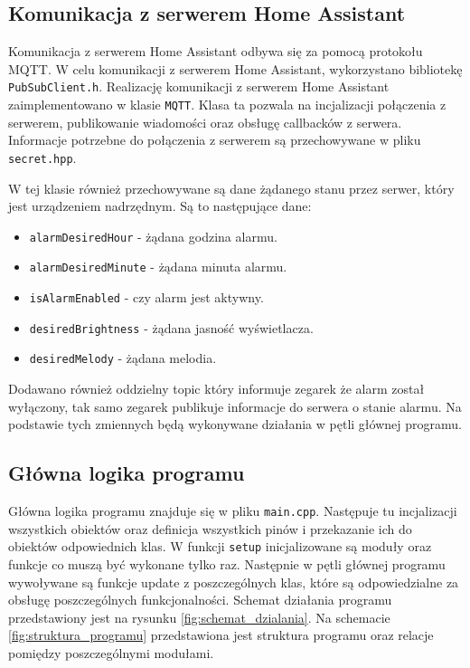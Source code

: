 \documentclass[../main.tex]{subfiles}
\begin{document}
\subsection{Komunikacja z serwerem Home Assistant}
Komunikacja z serwerem Home Assistant odbywa się za pomocą protokołu MQTT. W celu komunikacji z serwerem Home Assistant, wykorzystano bibliotekę \texttt{PubSubClient.h}.
Realizację komunikacji z serwerem Home Assistant zaimplementowano w klasie \texttt{MQTT}. Klasa ta pozwala na incjalizacji połączenia z serwerem, 
publikowanie wiadomości oraz obsługę callbacków z serwera. Informacje potrzebne do połączenia z serwerem są przechowywane w pliku \texttt{secret.hpp}.

W tej klasie również przechowywane są dane żądanego stanu przez serwer, który jest urządzeniem nadrzędnym. Są to następujące dane:
\begin{itemize}
  \item \texttt{alarmDesiredHour} - żądana godzina alarmu.
  \item \texttt{alarmDesiredMinute} - żądana minuta alarmu.
  \item \texttt{isAlarmEnabled} - czy alarm jest aktywny.
  \item \texttt{desiredBrightness} - żądana jasność wyświetlacza.
  \item \texttt{desiredMelody} - żądana melodia.
\end{itemize}

Dodawano również oddzielny topic który informuje zegarek że alarm został wyłączony, tak samo zegarek publikuje informacje do serwera o stanie alarmu.
Na podstawie tych zmiennych będą wykonywane działania w pętli głównej programu.

\subsection{Główna logika programu}
Główna logika programu znajduje się w pliku \texttt{main.cpp}. Następuje tu incjalizacji wszystkich obiektów oraz definicja wszystkich pinów i przekazanie ich do obiektów odpowiednich klas.
W funkcji \texttt{setup} inicjalizowane są moduły oraz funkcje co muszą być wykonane tylko raz.
Następnie w pętli głównej programu wywoływane są funkcje update z poszczególnych klas, które są odpowiedzialne za obsługę poszczególnych funkcjonalności.
Schemat działania programu przedstawiony jest na rysunku \ref{fig:schemat_dzialania}. Na schemacie \ref{fig:struktura_programu} przedstawiona jest struktura programu oraz
relacje pomiędzy poszczególnymi modułami.
\end{document}
